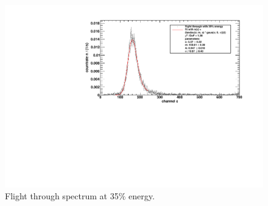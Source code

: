 \begin{figure}[H]
\begin{center}
  \includegraphics[width=\textwidth]{../img/energiekalibration_35.pdf}
  \caption{Flight through spectrum at 35$\%$ energy.}
  \label{img:label}
\end{center}
\end{figure}

